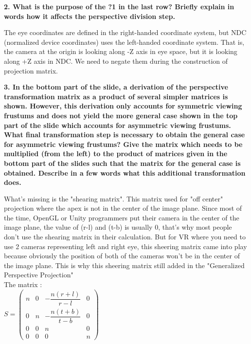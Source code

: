 \documentclass[10pt,a4paper]{article}
\begin{document}
\begin{flushleft}
{\bf 2. What is the purpose of the ?1 in the last row? Briefly explain in words how it affects the perspective division step. } \\
\end{flushleft}

The eye coordinates are defined in the right-handed coordinate system, but NDC (normalized device coordinates) uses the left-handed coordinate system. That is, the camera at the origin is looking along -Z axis in eye space, but it is looking along +Z axis in NDC. We need to negate them during the construction of projection matrix. \\

\begin{flushleft}
{\bf 3. In the bottom part of the slide, a derivation of the perspective transformation matrix as a product of several simpler matrices is shown. However, this derivation only accounts for symmetric viewing frustums and does not yield the more general case shown in the top part of the slide which accounts for asymmetric viewing frustums. What final transformation step is necessary to obtain the general case for asymmetric viewing frustums? Give the matrix which needs to be multiplied (from the left) to the product of matrices given in the bottom part of the slides such that the matrix for the general case is obtained. Describe in a few words what this additional transformation does. } \\
\end{flushleft}

What's missing is the "shearing matrix". This matrix used for "off center" projection where the apex is not in the center of the image plane. Since most of the time, OpenGL or Unity programmers put their camera in the center of the image plane, the value of (r-l) and (t-b) is usually 0, that's why most people don't use the shearing matrix in their calculation. But for VR where you need to use 2 cameras representing left and right eye, this sheering matrix came into play because obviously the position of both of the cameras won't be in the center of the image plane. This is why this sheering matrix still added in the "Generalized Perspective Projection" \\

The matrix : \\

\(
S =
  \begin{pmatrix}
    n & 0 & -\dfrac{n(r+l)}{r-l} & 0 \\
    0 & n & -\dfrac{n(t+b)}{t-b} & 0\\
    0 & 0 & n & 0 \\
    0 & 0 & 0 & n
  \end{pmatrix}
\) \\ \\
\end{document}
